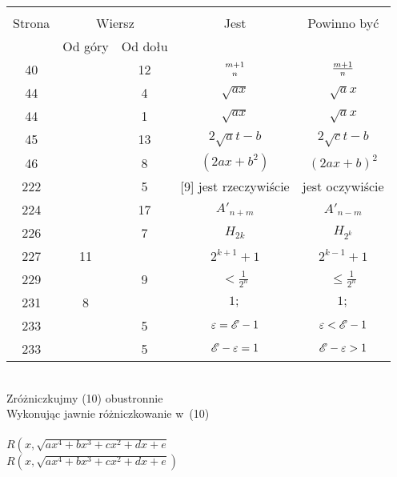 \documentclass[a4paper,11pt]{article}
\begin{document}
\begin{center}
  \begin{tabular}{|c|c|c|c|c|}
    \hline
    & \multicolumn{2}{c|}{} & & \\
    Strona & \multicolumn{2}{c|}{Wiersz} & Jest
                              & Powinno być \\ \cline{2-3}
    & Od góry & Od dołu & & \\
    \hline
    40  & & 12 & ${ m + 1 \atop n }$ & $\frac{ m + 1 }{ n }$ \\
    44  & &  4 & $\sqrt{ a x }$ & $\sqrt{ a } x$ \\
    44  & &  1 & $\sqrt{ a x }$ & $\sqrt{ a } x$ \\
    45  & & 13 & $2 \sqrt{ a } t - b$ & $2 \sqrt{ c } t - b$ \\
    46  & &  8 & $( 2 a x + b^{ 2 } )$ & $( 2 a x + b )^{ 2 }$ \\
    222 & &  5 & [9] jest rzeczywiście & jest oczywiście \\
    224 & & 17 & $A'_{ n + m }$ & $A'_{ n - m }$ \\
    226 & &  7 & $H_{ 2k }$ & $H_{ 2^{ k } }$ \\
    227 & 11 & & $2^{ k + 1 } + 1$ & $2^{ k - 1 } + 1$ \\
    229 & &  9 & $< \frac{ 1 }{ 2^{ n } }$ & $\leq \frac{ 1 }{ 2^{ n } }$ \\
    231 &  8 & & $1 ;$ & $1;$ \\
    233 & &  5 & $\varepsilon = \mathcal{E} - 1$ & $\varepsilon < \mathcal{E} - 1$ \\
    233 & &  5 & $\mathcal{E} - \varepsilon = 1$ & $\mathcal{E} - \varepsilon > 1$ \\
    \hline
  \end{tabular}
\end{center}
\noi
{} \\
\Jest Zróżniczkujmy (10) obustronnie \\
\Pow  Wykonując jawnie różniczkowanie w~(10) \\
 \\
\Jest $R\left( x, \sqrt{ a x^{ 4 } + b x^{ 3 } + c x^{ 2 } + d x + e }
\right.$ \\
\Pow $R\left( x, \sqrt{ a x^{ 4 } + b x^{ 3 } + c x^{ 2 } + d x + e }
\right)$ \\
\end{document}
